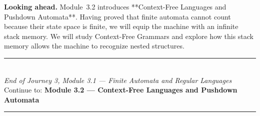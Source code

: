 \documentclass[12pt, a4paper]{book}
\begin{document}
\medskip
\noindent\textbf{Looking ahead.}
Module~3.2 introduces **Context-Free Languages and Pushdown Automata**. Having proved that finite automata cannot count because their state space is finite, we will equip the machine with an infinite stack memory. We will study Context-Free Grammars and explore how this stack memory allows the machine to recognize nested structures.

\vspace{1.4cm}
\begin{center}
{\color{JourneyColor}\rule{0.5\linewidth}{0.8pt}}\\[6pt]
{\small\color{JourneyColor}\textit{End of Journey 3, Module 3.1 --- Finite Automata and Regular Languages}}\\[4pt]
{\small\color{JourneyColor}Continue to: \textbf{Module 3.2 --- Context-Free Languages and Pushdown Automata}}\\[6pt]
{\color{JourneyColor}\rule{0.5\linewidth}{0.8pt}}
\end{center}
\end{document}

